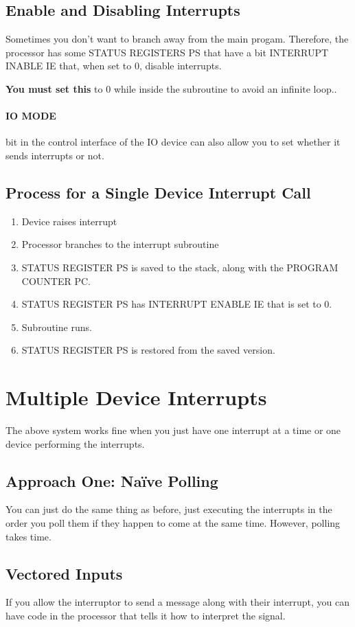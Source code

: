 \documentclass[a4paper,12pt]{report}
\begin{document}
\subsection{Enable and Disabling Interrupts} 
Sometimes you don't want to branch away from the main progam. Therefore, the processor has some STATUS REGISTERS PS that have a bit INTERRUPT INABLE IE 
that, when set to 0, disable interrupts.

\textbf{You must set this } to 0 while inside the subroutine to avoid an infinite loop.. 

\paragraph{IO MODE } bit in the control interface of the IO device can also allow you to set whether it sends interrupts or not.

\subsection{Process for a Single Device Interrupt Call}
\begin{enumerate}
\item Device raises interrupt
\item Processor branches to the interrupt subroutine
\item STATUS REGISTER PS is saved to the stack, along with the PROGRAM COUNTER PC.
\item STATUS REGISTER PS has INTERRUPT ENABLE IE that is set to 0. 
\item Subroutine runs.
\item STATUS REGISTER PS is restored from the saved version. 
\end{enumerate}

\section{Multiple Device Interrupts}
The above system works fine when you just have one interrupt at a time or one device performing the interrupts. 

\subsection{Approach One: Naïve Polling}
You can just do the same thing as before, just executing the interrupts in the order you poll them if they happen to come at the same time. However, 
polling takes time.

\subsection{Vectored Inputs}
If you allow the interruptor to send a message along with their interrupt, you can have code in the processor that tells it how to 
interpret the signal.
\end{document}
